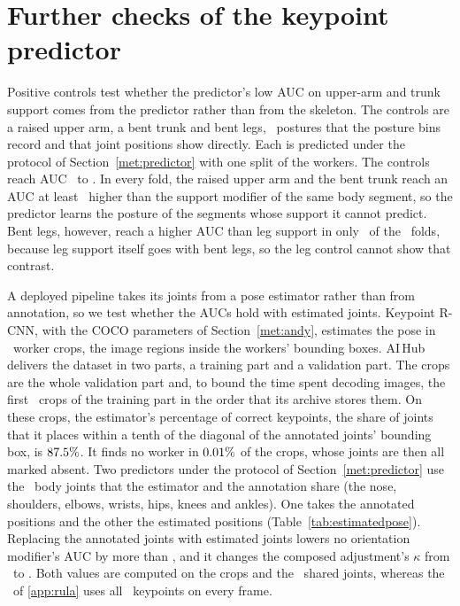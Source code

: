 \documentclass[review,3p,authoryear]{elsarticle}
\begin{document}
\clearpage
\section{Further checks of the keypoint predictor}
\label{app:checks}
\setcounter{table}{0}

Positive controls test whether the predictor's low AUC on upper-arm and trunk support comes
from the predictor rather than from the skeleton. The controls are a raised upper arm, a
bent trunk and bent legs, \ctrlNPairs\ postures that the posture bins record and that joint
positions show directly. Each is predicted under the protocol of
Section~\ref{met:predictor} with one split of the workers. The controls reach AUC \ctrlAucMin\ to
\ctrlAucMax. In every fold, the raised upper arm and the bent trunk reach an AUC at least
\ctrlMarginMin\ higher than the support modifier of the same body segment, so the
predictor learns the posture of the segments whose support it cannot predict. Bent legs,
however, reach a higher AUC than leg support in only \ctrlLegsFoldsWon\ of the \nFolds\
folds, because leg support itself goes with bent legs, so the leg control cannot show that
contrast.

A deployed pipeline takes its joints from a pose estimator rather than from annotation, so
we test whether the AUCs hold with estimated joints. Keypoint R-CNN, with the COCO
parameters of Section~\ref{met:andy}, estimates the pose in
\nCropsEst\ worker crops, the image regions inside the workers' bounding boxes. AI\,Hub
delivers the dataset in two parts, a training part and a validation part. The crops are
the whole validation part and, to bound the time spent decoding images, the first
\nCropsTrainCap\ crops of the training part in the order that its archive stores them.
On these crops, the estimator's percentage of correct keypoints, the share of joints that
it places within a tenth of the diagonal of the annotated joints' bounding box, is
$87.5\%$. It finds no worker in $0.01\%$ of
the crops, whose joints are then all marked absent. Two predictors under the protocol of
Section~\ref{met:predictor} use the \nJointsEst\ body joints that the estimator and the
annotation share (the nose, shoulders, elbows, wrists, hips, knees and ankles). One takes
the annotated positions and the other the estimated positions
(Table~\ref{tab:estimatedpose}).
Replacing the annotated joints with estimated joints lowers no orientation modifier's AUC
by more than \poseMaxOrientDropAuc, and it changes the composed adjustment's $\kappa$ from
\adjKappaGtThirteen\ to \adjKappaEstThirteen. Both values are computed on the crops and
the \nJointsEst\ shared joints, whereas the \adjKappaTotal\ of \ref{app:rula} uses all
\nKeypoints\ keypoints on every frame.
\end{document}
